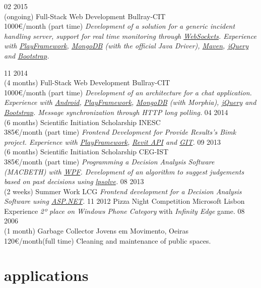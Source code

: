 \documentclass[]{friggeri-cv}
\begin{document}
\begin{entrylist}
  \entry
    {02 2015\\(ongoing)}
    {Full-Stack Web Development}
    {Bullray-CIT\\1000€/month (part time)}
    {\emph{Development of a solution for a generic incident handling server, support for real time monitoring through \underline{WebSockets}. Experience with \underline{PlayFramework}, \underline{MongoDB} (with the official Java Driver), \underline{Maven}, \underline{jQuery} and \underline{Bootstrap}.}}
    
  \entry
    {11 2014\\(4 months)}
    {Full-Stack Web Development}
    {Bullray-CIT\\1000€/month (part time)}
    {\emph{Development of an architecture for a chat application. Experience with \underline{Android}, \underline{PlayFramework}, \underline{MongoDB} (with Morphia), \underline{jQuery} and \underline{Bootstrap}. Message synchronization through HTTP long polling.}}
  \entry
    {04 2014\\(6 months)}
    {Scientific Initiation Scholarship}
    {INESC\\385€/month (part time)}
    {\emph{Frontend Development for Provide Results's Bimk project. Experience with \underline{PlayFramework}, \underline{Revit API} and \underline{GIT}.}}
  \entry
    {09 2013\\(6 months)}
    {Scientific Initiation Scholarship}
    {CEG-IST\\385€/month (part time)}
    {\emph{Programming a Decision Analysis Software (MACBETH) with \underline{WPF}. Development of an algorithm to suggest judgements based on past decisions using \underline{lpsolve}.}}
  \entry
    {08 2013\\(2 weeks)}
    {Summer Work}
    {LCG}
    {\emph{Frontend development for a Decision Analysis Software using \underline{ASP.NET}. }}
  \entry
    {11 2012}
    {Pizza Night Competition}
    {Microsoft Lisbon Experience}
    {\emph{2º place on Windows Phone Category} with \emph{Infinity Edge} game.}
  \entry
    {08 2006\\(1 month)}
    {Garbage Collector}
    {Jovens em Movimento, Oeiras\\120€/month(full time)}
    {Cleaning and maintenance of public spaces.}


\end{entrylist}

\section{applications}
\end{document}
